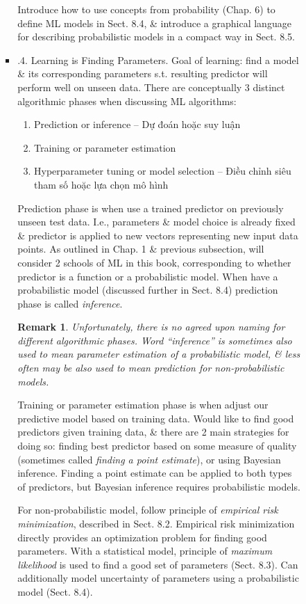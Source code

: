 \documentclass{article}
\newtheorem{remark}{Remark}
\begin{document}
\begin{enumerate}
\begin{itemize}
\begin{itemize}
\begin{itemize}
				Introduce how to use concepts from probability (Chap. 6) to define ML models in Sect. 8.4, \& introduce a graphical language for describing probabilistic models in a compact way in Sect. 8.5.
				\item {.4. Learning is Finding Parameters.} Goal of learning: find a model \& its corresponding parameters s.t. resulting predictor will perform well on unseen data. There are conceptually 3 distinct algorithmic phases when discussing ML algorithms:
				\begin{enumerate}
					\item Prediction or inference -- Dự đoán hoặc suy luận
					\item Training or parameter estimation
					\item Hyperparameter tuning or model selection -- Điều chỉnh siêu tham số hoặc lựa chọn mô hình
				\end{enumerate}
				Prediction phase is when use a trained predictor on previously unseen test data. I.e., parameters \& model choice is already fixed \& predictor is applied to new vectors representing new input data points. As outlined in Chap. 1 \& previous subsection, will consider 2 schools of ML in this book, corresponding to whether predictor is a function or a probabilistic model. When have a probabilistic model (discussed further in Sect. 8.4) prediction phase is called {\it inference}.
				\begin{remark}
					Unfortunately, there is no agreed upon naming for different algorithmic phases. Word ``inference'' is sometimes also used to mean parameter estimation of a probabilistic model, \& less often may be also used to mean prediction for non-probabilistic models.
				\end{remark}
				Training or parameter estimation phase is when adjust our predictive model based on training data. Would like to find good predictors given training data, \& there are 2 main strategies for doing so: finding best predictor based on some measure of quality (sometimes called {\it finding a point estimate}), or using Bayesian inference. Finding a point estimate can be applied to both types of predictors, but Bayesian inference requires probabilistic models.
				
				For non-probabilistic model, follow principle of {\it empirical risk minimization}, described in Sect. 8.2. Empirical risk minimization directly provides an optimization problem for finding good parameters. With a statistical model, principle of {\it maximum likelihood} is used to find a good set of parameters (Sect. 8.3). Can additionally model uncertainty of parameters using a probabilistic model (Sect. 8.4).
				

\end{itemize}
\end{itemize}
\end{itemize}
\end{enumerate}
\end{document}
